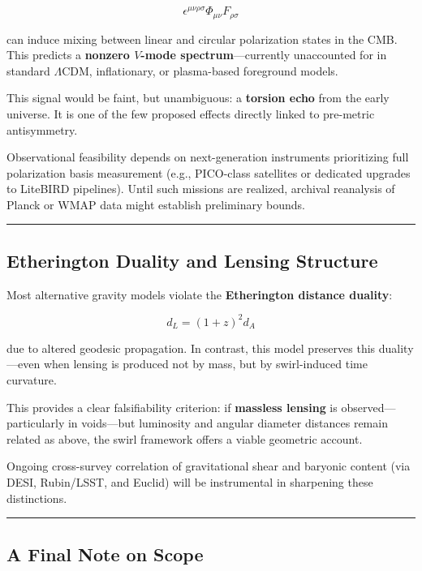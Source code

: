 \documentclass[
  11pt,
]{article}
\begin{document}
\[
\epsilon^{\mu\nu\rho\sigma} \Phi_{\mu\nu} F_{\rho\sigma}
\]

can induce mixing between linear and circular polarization states in the
CMB. This predicts a \textbf{nonzero \(V\)-mode spectrum}---currently
unaccounted for in standard \(\Lambda\)CDM, inflationary, or
plasma-based foreground models.

This signal would be faint, but unambiguous: a \textbf{torsion echo}
from the early universe. It is one of the few proposed effects directly
linked to pre-metric antisymmetry.

Observational feasibility depends on next-generation instruments
prioritizing full polarization basis measurement (e.g., PICO-class
satellites or dedicated upgrades to LiteBIRD pipelines). Until such
missions are realized, archival reanalysis of Planck or WMAP data might
establish preliminary bounds.

\begin{center}\rule{0.5\linewidth}{0.5pt}\end{center}

\subsection{Etherington Duality and Lensing
Structure}\label{etherington-duality-and-lensing-structure}

Most alternative gravity models violate the \textbf{Etherington distance
duality}:

\[
d_L = (1+z)^2 d_A
\]

due to altered geodesic propagation. In contrast, this model preserves
this duality---even when lensing is produced not by mass, but by
swirl-induced time curvature.

This provides a clear falsifiability criterion: if \textbf{massless
lensing} is observed---particularly in voids---but luminosity and
angular diameter distances remain related as above, the swirl framework
offers a viable geometric account.

Ongoing cross-survey correlation of gravitational shear and baryonic
content (via DESI, Rubin/LSST, and Euclid) will be instrumental in
sharpening these distinctions.

\begin{center}\rule{0.5\linewidth}{0.5pt}\end{center}

\subsection{A Final Note on Scope}\label{a-final-note-on-scope}
\end{document}
